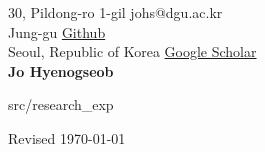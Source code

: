 \documentclass{cv} %
\begin{document}
30, Pildong-ro 1-gil \hfill johs@dgu.ac.kr\\
Jung-gu \hfill \href{https://github.com/johyeongseob}{Github}\\
Seoul, Republic of Korea \hfill \href{https://scholar.google.com/citations?user=oIyfv_gAAAAJ&hl=en}{Google Scholar}\\

\hfil{\namesize\bf Jo Hyenogseob}\hfil





 {src/research_exp}

\vspace{1in}




%



\hfill Revised \today
\end{document}
